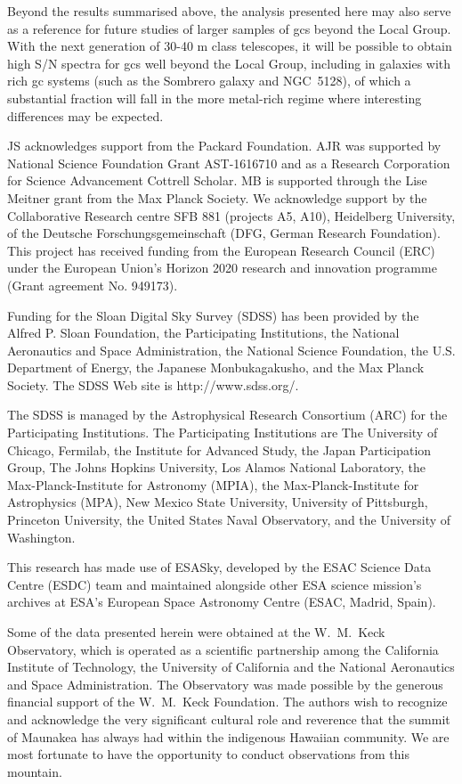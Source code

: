 \documentclass{aa}
\begin{document}
Beyond the results summarised above, the analysis presented here may also serve as a reference for future studies of larger samples of \acp{gc} beyond the Local Group. With the next generation of 30-40 m class telescopes, it will be possible to obtain high S/N spectra for \acp{gc} well beyond the Local Group, including in galaxies with rich \ac{gc} systems (such as the Sombrero galaxy and NGC~5128), of which a substantial fraction will fall in the more metal-rich regime where interesting differences may be expected. 

\begin{acknowledgements}

JS acknowledges support from the Packard Foundation.
AJR was supported by National Science Foundation Grant AST-1616710 and as a Research Corporation for Science Advancement Cottrell Scholar.
MB is supported through the Lise Meitner grant from the Max Planck Society. We acknowledge support by the Collaborative Research centre SFB 881 (projects A5, A10), Heidelberg University, of the Deutsche Forschungsgemeinschaft (DFG, German Research Foundation).  This project has received funding from the European Research Council (ERC) under the European Union’s Horizon 2020 research and innovation programme (Grant agreement No. 949173).

Funding for the Sloan Digital Sky Survey (SDSS) has been provided by the Alfred P. Sloan Foundation, the Participating Institutions, the National Aeronautics and Space Administration, the National Science Foundation, the U.S. Department of Energy, the Japanese Monbukagakusho, and the Max Planck Society. The SDSS Web site is http://www.sdss.org/.

The SDSS is managed by the Astrophysical Research Consortium (ARC) for the Participating Institutions. The Participating Institutions are The University of Chicago, Fermilab, the Institute for Advanced Study, the Japan Participation Group, The Johns Hopkins University, Los Alamos National Laboratory, the Max-Planck-Institute for Astronomy (MPIA), the Max-Planck-Institute for Astrophysics (MPA), New Mexico State University, University of Pittsburgh, Princeton University, the United States Naval Observatory, and the University of Washington.

This research has made use of ESASky, developed by the ESAC Science Data Centre (ESDC) team and maintained alongside other ESA science mission's archives at ESA's European Space Astronomy Centre (ESAC, Madrid, Spain).

Some of the data presented herein were obtained at the W.~M.\ Keck Observatory, which is operated as a scientific partnership among the California Institute of Technology, the University of California and the National Aeronautics and Space Administration. The Observatory was made possible by the generous financial support of the W.~M.\ Keck Foundation. 
The authors wish to recognize and acknowledge the very significant cultural role and reverence that the summit of Maunakea has always had within the indigenous Hawaiian community.  We are most fortunate to have the opportunity to conduct observations from this mountain. 


\end{acknowledgements}
\end{document}
